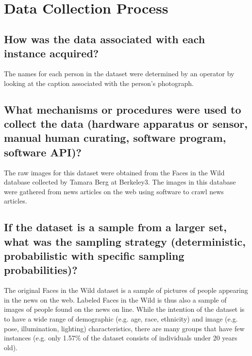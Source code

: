 \section*{Data Collection Process}

\subsection*{How was the data associated with each instance acquired?}

\noindent The names for each person in the dataset were determined by an
operator by looking at the caption associated with the person’s
photograph.

\subsection*{What mechanisms or procedures were used to collect the data (\eg hardware apparatus or sensor, manual human curating, software program, software API)?}
\noindent The raw images for this dataset were obtained from the Faces in
the Wild database collected by Tamara Berg at Berkeley3. The images in this database were gathered from news articles on the web using software to crawl news articles.


\subsection*{If the dataset is a sample from a larger set, what was the sampling strategy (\eg deterministic, probabilistic with specific sampling probabilities)?}

\noindent The original Faces in the Wild dataset is a sample of pictures of people appearing in the news on the web. Labeled Faces in the
Wild is thus also a sample of images of people found on the news
on line. While the intention of the dataset is to have a wide range
of demographic (e.g. age, race, ethnicity) and image (e.g. pose,
illumination, lighting) characteristics, there are many groups that
have few instances (e.g. only 1.57\% of the dataset consists of
individuals under 20 years old).


